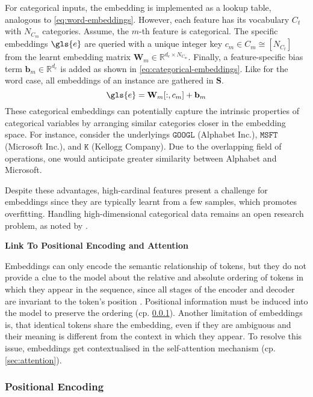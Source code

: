 For categorical inputs, the embedding is implemented as a lookup table, analogous to \cref{eq:word-embeddings}. However, each feature has
its vocabulary $C_t$ with $N_{C_m}$ categories. Assume, the $m$-th feature is categorical. The specific embeddings $\gls{e}$ are queried with a unique integer key $c_{m} \in C_m \cong\left[N_{C_t}\right]$ from the learnt embedding matrix $\mathbf{W}_m \in \mathbb{R}^{d_e \times N_{C_m}}$. Finally, a feature-specific bias term $\mathbf{b}_m \in \mathbb{R}^{d_{e}}$ is added as shown in \cref{eq:categorical-embeddings}. Like for the word case, all embeddings of an instance are gathered in $\mathbf{S}$.
\begin{equation}
    \gls{e}=\mathbf{W}_m[:,c_{m}] +\mathbf{b}_m
    \label{eq:categorical-embeddings}
\end{equation}
These categorical embeddings can potentially capture the intrinsic properties of categorical variables by arranging similar categories closer in the embedding space. For instance, consider the underlyings $\mathtt{GOOGL}$ (Alphabet Inc.), $\mathtt{MSFT}$ (Microsoft Inc.), and $\mathtt{K}$ (Kellogg Company). Due to the overlapping field of operations, one would anticipate greater similarity between Alphabet and Microsoft.

Despite these advantages, high-cardinal features present a challenge for embeddings since they are typically learnt from a few samples, which promotes \gls{overfitting}. Handling high-dimensional categorical data remains an open research problem, as noted by \textcite[][2]{borisovDeepNeuralNetworks2022}.

\textbf{Link To Positional Encoding and Attention}

Embeddings can only encode the semantic relationship of tokens, but they do not provide a clue to the model about the relative and absolute ordering of tokens in which they appear in the sequence, since all stages of the encoder and decoder are invariant to the token's position \autocite[][3744]{leeSetTransformerFramework2019}. Positional information must be induced into the model to preserve the ordering (cp. \cref{sec:positional-encoding}). Another limitation of embeddings is, that identical tokens share the embedding, even if they are ambiguous and their meaning is different from the context in which they appear. To resolve this issue, embeddings get contextualised in the self-attention mechanism (cp. \cref{sec:attention}).

\subsubsection{Positional Encoding}\label{sec:positional-encoding}

